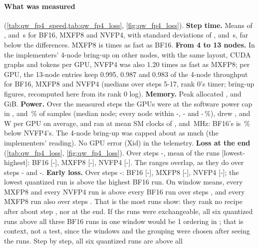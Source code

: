 \paragraph{What was measured} (\cref{tab:qw_fp4_speed,tab:qw_fp4_loss}, \cref{fig:qw_fp4_loss}). \textbf{Step time.} Means of \TriQwFpFourStepBf, \TriQwFpFourStepMx{} and \TriQwFpFourStepNv\,s for BF16, MXFP8 and NVFP4, with standard deviations of \TriQwFpFourSdBf, \TriQwFpFourSdMx{} and \TriQwFpFourSdNv\,s, far below the differences. MXFP8 is \TriQwFpFourSpMxBf{} times as fast as BF16. \textbf{From 4 to 13 nodes.} In the implementers' 4-node bring-up on other nodes, with the same layout, CUDA graphs and tokens per GPU, NVFP4 was also 1.20 times as fast as MXFP8; per GPU, the 13-node entries keep 0.995, 0.987 and 0.983 of the 4-node throughput for BF16, MXFP8 and NVFP4 (medians over steps 5-17, rank 0's timer; bring-up figures, recomputed here from its rank 0 log). \textbf{Memory.} Peak allocated \TriQwFpFourMemBf, \TriQwFpFourMemMx{} and \TriQwFpFourMemNv{} GiB. \textbf{Power.} Over the measured steps the GPUs were at the software power cap in \TriQwFpFourCapMedBf, \TriQwFpFourCapMedMx{} and \TriQwFpFourCapMedNv\,\% of samples (median node; every node within \TriQwFpFourCapLoBf-\TriQwFpFourCapHiBf, \TriQwFpFourCapLoMx-\TriQwFpFourCapHiMx{} and \TriQwFpFourCapLoNv-\TriQwFpFourCapHiNv\,\%), drew \TriQwFpFourPowerBf, \TriQwFpFourPowerMx{} and \TriQwFpFourPowerNv\,W per GPU on average, and ran at mean SM clocks of \TriQwFpFourSmBf, \TriQwFpFourSmMx{} and \TriQwFpFourSmNv\,MHz: BF16's is \TriQwFpFourSmBfNvPct\,\% below NVFP4's. The 4-node bring-up was capped about as much (the implementers' reading). No GPU error (Xid) in the telemetry. \textbf{Loss at the end} (\cref{tab:qw_fp4_loss}, \cref{fig:qw_fp4_loss}). Over steps \TriQwFpFourWinEndFrom-\TriQwFpFourWinEndTo, mean of the \TriQwFpFourLRuns{} runs [lowest-highest]: BF16 \TriQwFpFourWinEndBf{} [\TriQwFpFourWinEndLoBf-\TriQwFpFourWinEndHiBf], MXFP8 \TriQwFpFourWinEndMx{} [\TriQwFpFourWinEndLoMx-\TriQwFpFourWinEndHiMx], NVFP4 \TriQwFpFourWinEndNv{} [\TriQwFpFourWinEndLoNv-\TriQwFpFourWinEndHiNv]. The ranges overlap, as they do over steps \TriQwFpFourWinMidFrom-\TriQwFpFourWinMidTo{} and \TriQwFpFourWinLateFrom-\TriQwFpFourWinLateTo. \textbf{Early loss.} Over steps \TriQwFpFourWinEarlyFrom-\TriQwFpFourWinEarlyTo: BF16 \TriQwFpFourWinEarlyBf{} [\TriQwFpFourWinEarlyLoBf-\TriQwFpFourWinEarlyHiBf], MXFP8 \TriQwFpFourWinEarlyMx{} [\TriQwFpFourWinEarlyLoMx-\TriQwFpFourWinEarlyHiMx], NVFP4 \TriQwFpFourWinEarlyNv{} [\TriQwFpFourWinEarlyLoNv-\TriQwFpFourWinEarlyHiNv]; the lowest quantized run is \TriQwFpFourEarlyMargin{} above the highest BF16 run. On window means, every MXFP8 and every NVFP4 run is above every BF16 run over steps \TriQwFpFourSepWinBoth, and every MXFP8 run also over steps \TriQwFpFourSepWinMx. That is the most \TriQwFpFourLRuns{} runs show: they rank no recipe after about step \TriQwFpFourCut, nor at the end. If the \TriQwFpFourLJobs{} runs were exchangeable, all six quantized runs above all three BF16 runs in one window would be 1 ordering in \TriQwFpFourOddsAll; that is context, not a test, since the windows and the grouping were chosen after seeing the runs. Step by step, all six quantized runs are above all 